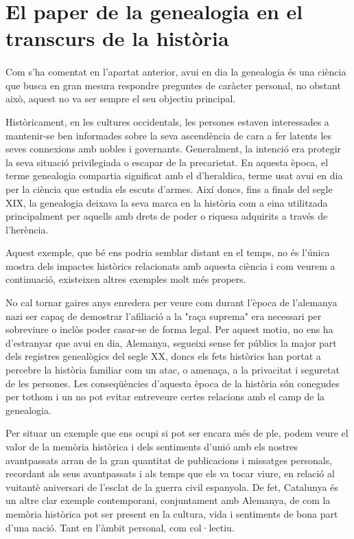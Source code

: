 \section{El paper de la genealogia en el transcurs de la història}

    \paragraph{}
    Com s’ha comentat en l'apartat anterior, avui en dia la genealogia és una ciència que busca en gran mesura respondre preguntes de caràcter personal, no obstant això, aquest no va ser sempre el seu objectiu principal.

    Històricament, en les cultures occidentals, les persones estaven interessades a mantenir-se ben informades sobre la seva ascendència de cara a fer latents les seves connexions amb nobles i governants. Generalment, la intenció era protegir la seva situació privilegiada o escapar de la precarietat. En aquesta època, el terme genealogia compartia significat amb el d'\gls{heraldica}, terme usat avui en dia per la ciència que estudia els escuts d’armes. Així doncs, fins a finals del segle XIX, la genealogia deixava la seva marca en la història com a eina utilitzada principalment per aquells amb drets de poder o riquesa adquirits a través de l’herència.

    Aquest exemple, que bé ens podria semblar distant en el temps, no és l’única mostra dels impactes històrics relacionats amb aquesta ciència i com veurem a continuació, existeixen altres exemples molt més propers.

    No cal tornar gaires anys enredera per veure com durant l’època de l’alemanya nazi ser capaç de demostrar l’afiliació a la "raça suprema" era necessari per sobreviure o inclòs poder casar-se de forma legal. Per aquest motiu, no ens ha d’estranyar que avui en dia, Alemanya, segueixi sense fer públics la major part dels registres genealògics del segle XX, doncs els fets històrics han portat a percebre la història familiar com un atac, o amenaça, a la privacitat i seguretat de les persones. Les conseqüències d'aquesta època de la història són conegudes per tothom i un no pot evitar entreveure certes relacions amb el camp de la genealogia.

    Per situar un exemple que ens ocupi si pot ser encara més de ple, podem veure el valor de la memòria històrica i dels sentiments d’unió amb els nostres avantpassats arran de la gran quantitat de publicacions i missatges personals, recordant als seus avantpassats i als temps que els va tocar viure, en relació al vuitantè aniversari de l'esclat de la guerra civil espanyola. De fet, Catalunya és un altre clar exemple contemporani, conjuntament amb Alemanya, de com la memòria històrica pot ser present en la cultura, vida i sentiments de bona part d’una nació. Tant en l’àmbit personal, com col·lectiu.


